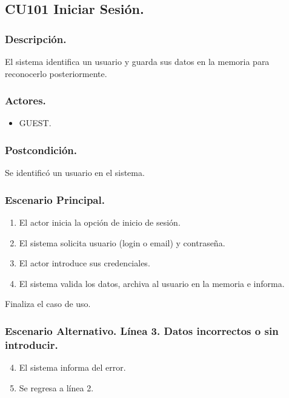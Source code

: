 \subsection{CU101 Iniciar Sesi\'{o}n.}
\subsubsection{Descripci\'{o}n.}
El sistema identifica un usuario y guarda sus datos en la memoria para reconocerlo posteriormente.
\subsubsection{Actores.}
\begin{itemize}
\item GUEST.
\end{itemize}
\subsubsection{Postcondici\'{o}n.}
Se identific\'{o} un usuario en el sistema.
\subsubsection{Escenario Principal.}
\begin{enumerate}
\item El actor inicia la opci\'{o}n de inicio de sesi\'{o}n.
\item El sistema solicita usuario (login o email) y contrase\~{n}a.
\item El actor introduce sus credenciales.
\item El sistema valida los datos, archiva al usuario en la memoria e informa.
\end{enumerate}
Finaliza el caso de uso.
\subsubsection{Escenario Alternativo. L\'{i}nea 3. Datos incorrectos o sin introducir.}
\begin{enumerate}
\setcounter{enumi}{3}
\item El sistema informa del error.
\item Se regresa a l\'{i}nea 2.
\end{enumerate}

